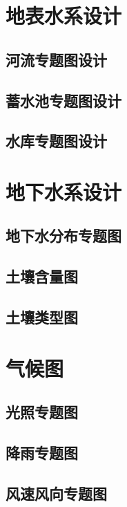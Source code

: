 \section{地表水系设计}

\subsection{河流专题图设计}
\subsection{蓄水池专题图设计}
\subsection{水库专题图设计}
\section{地下水系设计}
\subsection{地下水分布专题图}
\subsection{土壤含量图}
\subsection{土壤类型图}
\section{气候图}
\subsection{光照专题图}
\subsection{降雨专题图}
\subsection{风速风向专题图}


